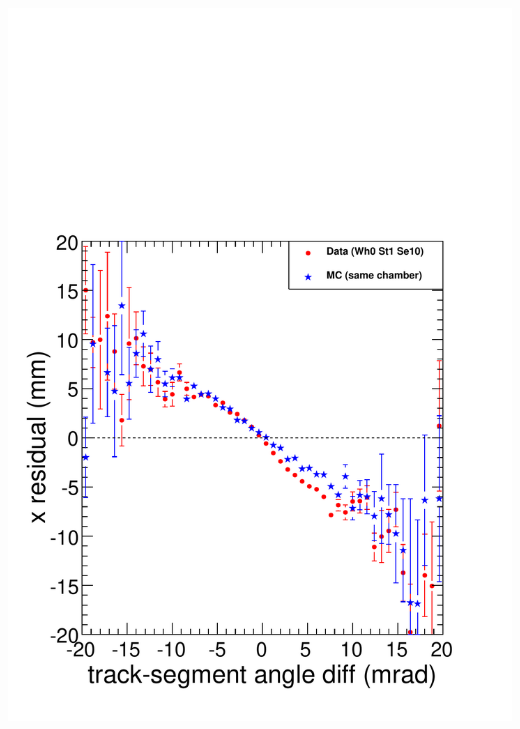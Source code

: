 \documentclass[compress]{beamer}
\begin{document}
\begin{frame}
\begin{columns}
\includegraphics[width=\linewidth]{understandable_effect.pdf}
\end{columns}
\end{frame}
\end{document}
